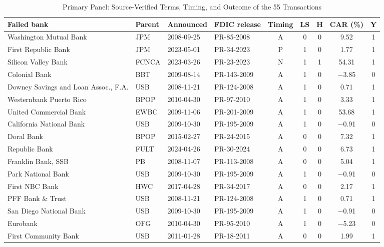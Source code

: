 \begin{table}[!t]
\caption{Primary Panel: Source-Verified Terms, Timing, and Outcome of the 55 Transactions}
\label{tab:appendix}
\centering
\scriptsize
\setlength{\tabcolsep}{3pt}
\renewcommand{\arraystretch}{0.95}
\begin{tabular*}{\textwidth}{@{\extracolsep{\fill}}llllccccc}
\toprule
\textbf{Failed bank} & \textbf{Parent} & \textbf{Announced} & \textbf{FDIC release} & \textbf{Timing} & \textbf{LS} & \textbf{H} & \textbf{CAR (\%)} & \textbf{Y} \\
\midrule
Washington Mutual Bank & JPM & 2008-09-25 & PR-85-2008 & A & 0 & 0 & 9.52 & 1 \\
First Republic Bank & JPM & 2023-05-01 & PR-34-2023 & P & 1 & 0 & 1.77 & 1 \\
Silicon Valley Bank & FCNCA & 2023-03-26 & PR-23-2023 & N & 1 & 1 & 54.31 & 1 \\
Colonial Bank & BBT & 2009-08-14 & PR-143-2009 & A & 1 & 0 & $-$3.85 & 0 \\
Downey Savings and Loan Assoc., F.A. & USB & 2008-11-21 & PR-124-2008 & A & 1 & 0 & 0.71 & 1 \\
Westernbank Puerto Rico & BPOP & 2010-04-30 & PR-97-2010 & A & 1 & 0 & 3.33 & 1 \\
United Commercial Bank & EWBC & 2009-11-06 & PR-201-2009 & A & 1 & 0 & 53.68 & 1 \\
California National Bank & USB & 2009-10-30 & PR-195-2009 & A & 1 & 0 & $-$0.91 & 0 \\
Doral Bank & BPOP & 2015-02-27 & PR-24-2015 & A & 0 & 0 & 7.32 & 1 \\
Republic Bank & FULT & 2024-04-26 & PR-30-2024 & A & 0 & 0 & 6.73 & 1 \\
Franklin Bank, SSB & PB & 2008-11-07 & PR-113-2008 & A & 0 & 0 & 5.04 & 1 \\
Park National Bank & USB & 2009-10-30 & PR-195-2009 & A & 1 & 0 & $-$0.91 & 0 \\
First NBC Bank & HWC & 2017-04-28 & PR-34-2017 & A & 0 & 0 & 2.17 & 1 \\
PFF Bank \& Trust & USB & 2008-11-21 & PR-124-2008 & A & 1 & 0 & 0.71 & 1 \\
San Diego National Bank & USB & 2009-10-30 & PR-195-2009 & A & 1 & 0 & $-$0.91 & 0 \\
Eurobank & OFG & 2010-04-30 & PR-95-2010 & A & 1 & 0 & $-$5.23 & 0 \\
First Community Bank & USB & 2011-01-28 & PR-18-2011 & A & 0 & 0 & 1.99 & 1 \\

\end{tabular*}
\end{table}
